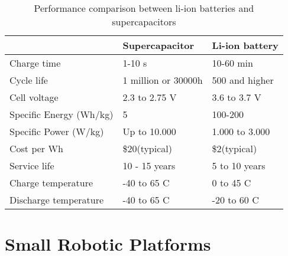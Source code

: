 \begin{table}[t]
	\centering
	\begin{threeparttable}
		\caption{Performance comparison between li-ion batteries and supercapacitors}
		\label{tab:battery_vs_supercap}
		\small
		\begin{tabular}{|l|l|l|}
			\hline
			& Supercapacitor & Li-ion battery \\
			\hline \hline
			Charge time & 1-10 s & 10-60 min \\
			Cycle life & 1 million or 30000h & 500 and higher \\
			Cell voltage & 2.3 to 2.75 V & 3.6 to 3.7 V \\
			Specific Energy (Wh/kg) & 5 & 100-200 \\
			Specific Power (W/kg) & Up to 10.000 & 1.000 to 3.000 \\
			Cost per Wh & \$20(typical) & \$2(typical) \\
			Service life & 10 - 15 years & 5 to 10 years \\
			Charge temperature & -40 to 65 \textdegree C & 0 to 45 \textdegree C \\
			Discharge temperature & -40 to 65 \textdegree C & -20 to 60 \textdegree C \\
			\hline
		\end{tabular}
	\end{threeparttable}
\end{table}


\section{Small Robotic Platforms}
\label{sec:robotic_platforms}




